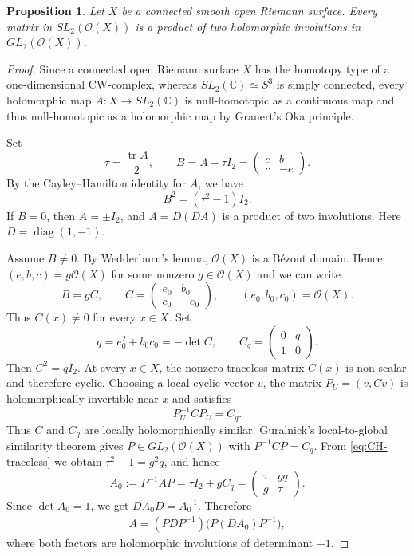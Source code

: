 \documentclass{amsart}
\newcommand{\C}{\mathbb{C}}
\newcommand{\Ocal}{\mathcal O}
\newcommand{\diag}{\operatorname{diag}}
\newtheorem{proposition}[theorem]{Proposition}
\theoremstyle{definition}
\begin{document}
 

\begin{proposition}\label{prop:smooth-holomorphic}
Let $X$ be a connected smooth open Riemann surface.  Every matrix  in  $SL_2(\Ocal(X))$ is a product of two holomorphic involutions in
$GL_2(\Ocal(X))$. 
\end{proposition}

\begin{proof}
Since a connected open Riemann surface $X$ has the homotopy type
of a one-dimensional CW-complex, whereas $SL_2(\C)\simeq S^3$ is simply
connected, every holomorphic map $A : X \to SL_2(\C)$ is null-homotopic as a continuous map and thus null-homotopic as a holomorphic map by Grauert's Oka principle.

Set
\[
 \tau=\frac{\operatorname{tr}A}{2},\qquad
 B=A-\tau I_2=\begin{pmatrix}e&b\\c&-e\end{pmatrix}.
\]
By the Cayley--Hamilton identity for $A$, we have
\begin{equation}\label{eq:CH-traceless}
 B^2=(\tau^2-1)I_2.
\end{equation}
If $B=0$, then $A=\pm I_2$, and $A=D(DA)$ is a product of two involutions. Here $D = \diag(1,-1)$.

Assume $B\neq0$.  By Wedderburn's lemma, $\mathcal{O}(X)$ is a B{\'e}zout
domain.  Hence $(e,b,c)=g \mathcal{O}(X)$ for some nonzero
$g\in \mathcal{O}(X)$ and we can write
\[
 B=gC,\qquad C=\begin{pmatrix}e_0&b_0\\c_0&-e_0\end{pmatrix},
 \qquad (e_0,b_0,c_0)=\mathcal{O}(X).
\]
Thus $C(x)\neq0$ for every $x\in X$.  Set
\[
 q=e_0^2+b_0c_0=-\det C,
 \qquad C_q=\begin{pmatrix}0&q\\1&0\end{pmatrix}.
\]
Then $C^2=qI_2$.  At every $x\in X$, the nonzero traceless matrix $C(x)$ is
non-scalar and therefore cyclic.  Choosing a local cyclic vector $v$, the
matrix $P_U=(v,Cv)$ is holomorphically invertible near $x$ and satisfies
\[
 P_U^{-1}CP_U=C_q.
\]
Thus $C$ and $C_q$ are locally holomorphically similar.  Guralnick's
local-to-global similarity theorem \cite{Guralnick} gives
$P\in GL_2(\Ocal(X))$ with $P^{-1}CP=C_q$.  From
\eqref{eq:CH-traceless} we obtain $\tau^2-1=g^2q$, and hence
\[
 A_0:= P^{-1}AP = \tau I_2 + g C_q
   = \begin{pmatrix}\tau&gq\\g&\tau\end{pmatrix}.
\]
Since $\det A_0=1$, we get $DA_0D=A_0^{-1}$. 
Therefore
\begin{align*}
 A=(PDP^{-1})\bigl(P(DA_0)P^{-1}\bigr),
\end{align*}
where both factors are holomorphic
involutions of determinant $-1$.
\end{proof}
\end{document}
